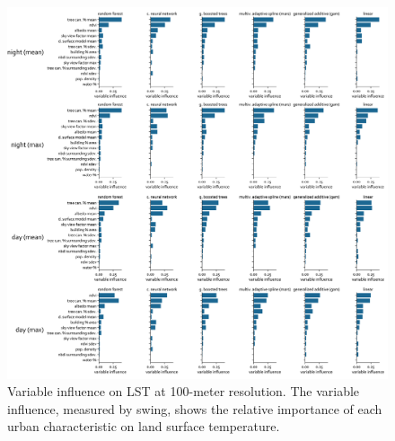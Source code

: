 \documentclass[final,3p,times,onecolumn,sort&compress]{elsarticle}
\begin{document}
\begin{figure}
    \begin{center}
    \includegraphics[width=\linewidth]{fig/report/importance_100.png}
    \caption[Variable influence on LST at 100-meter resolution]{
    Variable influence on LST at 100-meter resolution.
    The variable influence, measured by swing, shows the relative importance of each urban characteristic on land surface temperature.}
    \label{fig:importance_100}
    \end{center}
\end{figure}
\end{document}
